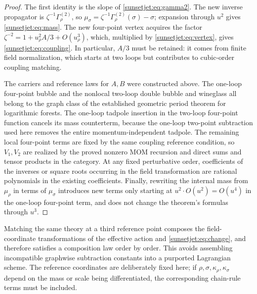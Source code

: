 \documentclass[11pt,a4paper,oneside]{article}
\theoremstyle{plain}
\theoremstyle{definition}
\theoremstyle{remark}
\numberwithin{equation}{section}
\begin{document}
\begin{proof}
The first identity is the slope of \eqref{sunsetjet:eq:gamma2}.
The new inverse propagator is $\zeta^{-1}\Gamma^{(2)}_\rho$,
so $\mu_\sigma=\zeta^{-1}\Gamma^{(2)}_\rho(\sigma)-\sigma$;
expansion through $u^2$ gives \eqref{sunsetjet:eq:mass}.
The new four-point vertex acquires the factor $\zeta^{-2}=1+u_\rho^2 A/3+O(u_\rho^3)$,
which, multiplied by \eqref{sunsetjet:eq:vertex}, gives \eqref{sunsetjet:eq:coupling}.
In particular, $A/3$ must be retained: it comes from finite field normalization, which starts at two loops but contributes to cubic-order coupling matching.

The carriers and reference laws for $A,B$ were constructed above.
The one-loop four-point bubble and the nonlocal two-loop double bubble and wineglass all belong to the graph class of the established geometric period theorem for logarithmic forests.
The one-loop tadpole insertion in the two-loop four-point function cancels its mass counterterm,
because the one-loop two-point subtraction used here removes the entire momentum-independent tadpole.
The remaining local four-point terms are fixed by the same coupling reference condition,
so $V_1,V_2$ are realized by the proved nonzero MOM recursion and direct sums and tensor products in the category.
At any fixed perturbative order, coefficients of the inverses or square roots occurring in the field transformation are rational polynomials in the existing coefficients.
Finally, rewriting the internal mass from $\mu_\rho$ in terms of $\mu_\sigma$
introduces new terms only starting at $u^2\cdot O(u^2)=O(u^4)$ in the one-loop four-point term,
and does not change the theorem's formulas through $u^3$.
\end{proof}

Matching the same theory at a third reference point composes the field-coordinate transformations of the effective action and
\eqref{sunsetjet:eq:change}, and therefore satisfies a composition law order by order.
This avoids assembling incompatible graphwise subtraction constants into a purported Lagrangian scheme.
The reference coordinates are deliberately fixed here; if $\rho,\sigma,\kappa_\rho,\kappa_\sigma$
depend on the mass or scale being differentiated, the corresponding chain-rule terms must be included.
\end{document}
